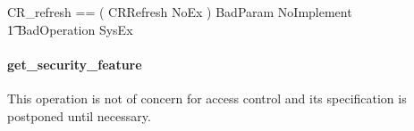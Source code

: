 \begin{zed}
  CR\_refresh == ( CRRefresh \land NoEx ) \lor BadParam \lor NoImplement \lor \\
  \t1 BadOperation \lor SysEx 
\end{zed}


\paragraph{get\_security\_feature} 
This operation is not of concern for access control and its specification is
postponed until necessary.




